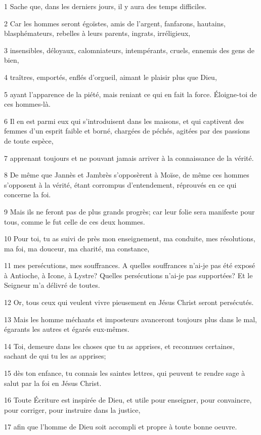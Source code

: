 \par 1 Sache que, dans les derniers jours, il y aura des temps difficiles.
\par 2 Car les hommes seront égoïstes, amis de l'argent, fanfarons, hautains, blasphémateurs, rebelles à leurs parents, ingrats, irréligieux,
\par 3 insensibles, déloyaux, calomniateurs, intempérants, cruels, ennemis des gens de bien,
\par 4 traîtres, emportés, enflés d'orgueil, aimant le plaisir plus que Dieu,
\par 5 ayant l'apparence de la piété, mais reniant ce qui en fait la force. Éloigne-toi de ces hommes-là.
\par 6 Il en est parmi eux qui s'introduisent dans les maisons, et qui captivent des femmes d'un esprit faible et borné, chargées de péchés, agitées par des passions de toute espèce,
\par 7 apprenant toujours et ne pouvant jamais arriver à la connaissance de la vérité.
\par 8 De même que Jannès et Jambrès s'opposèrent à Moïse, de même ces hommes s'opposent à la vérité, étant corrompus d'entendement, réprouvés en ce qui concerne la foi.
\par 9 Mais ils ne feront pas de plus grands progrès; car leur folie sera manifeste pour tous, comme le fut celle de ces deux hommes.
\par 10 Pour toi, tu as suivi de près mon enseignement, ma conduite, mes résolutions, ma foi, ma douceur, ma charité, ma constance,
\par 11 mes persécutions, mes souffrances. A quelles souffrances n'ai-je pas été exposé à Antioche, à Icone, à Lystre? Quelles persécutions n'ai-je pas supportées? Et le Seigneur m'a délivré de toutes.
\par 12 Or, tous ceux qui veulent vivre pieusement en Jésus Christ seront persécutés.
\par 13 Mais les homme méchants et imposteurs avanceront toujours plus dans le mal, égarants les autres et égarés eux-mêmes.
\par 14 Toi, demeure dans les choses que tu as apprises, et reconnues certaines, sachant de qui tu les as apprises;
\par 15 dès ton enfance, tu connais les saintes lettres, qui peuvent te rendre sage à salut par la foi en Jésus Christ.
\par 16 Toute Écriture est inspirée de Dieu, et utile pour enseigner, pour convaincre, pour corriger, pour instruire dans la justice,
\par 17 afin que l'homme de Dieu soit accompli et propre à toute bonne oeuvre.

